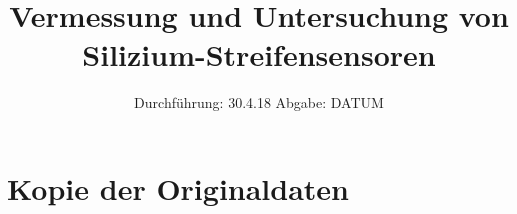 

\subject{V 15}
\title{Vermessung und Untersuchung von Silizium-Streifensensoren}
\date{
  Durchführung: 30.4.18
  \hspace{3em}
  Abgabe: DATUM
}



\maketitle
\thispagestyle{empty}
\tableofcontents
\newpage






\printbibliography

\appendix
\section{Kopie der Originaldaten}


